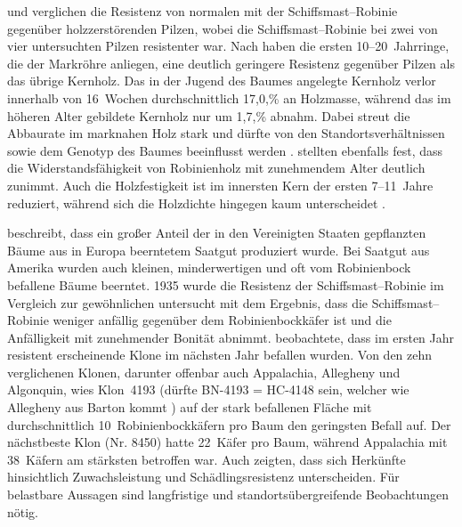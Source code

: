 \documentclass[twocolumn]{scrartcl}
\begin{document}
\citet{hirt1938robinie} und \citet{toole1938robinie} verglichen die
Resistenz von normalen mit der Schiffsmast--Robinie gegenüber
holzzerstörenden Pilzen, wobei die Schiffsmast--Robinie bei zwei von
vier untersuchten Pilzen resistenter war.
Nach \citet{duenisch2009robineHolzJungAlt} haben die ersten
10--20~Jahrringe, die der Markröhre anliegen, eine deutlich geringere
Resistenz gegenüber Pilzen als das übrige Kernholz. Das in der Jugend
des Baumes angelegte Kernholz verlor innerhalb von 16~Wochen
durchschnittlich 17,0,\% an Holzmasse, während das im höheren Alter
gebildete Kernholz nur um 1,7,\% abnahm. Dabei streut die Abbaurate im
marknahen Holz stark und dürfte von den Standortsverhältnissen sowie
dem Genotyp des Baumes beeinflusst werden \citep{brischke2024robineDauerhaftigkeit}.
\citet{szczepkowski2025robinePilze} stellten ebenfalls fest, dass die
Widerstandsfähigkeit von Robinienholz mit zunehmendem Alter deutlich
zunimmt.
Auch die Holzfestigkeit ist im innersten Kern der ersten 7--11~Jahre
reduziert, während sich die Holzdichte hingegen kaum unterscheidet
\citep{adamopoulos2007jungesUndAltesRobinienholz,bijak2021robinienholz}.

\citet{hall1937robinie} beschreibt, dass ein großer Anteil der in den
Vereinigten Staaten gepflanzten Bäume aus in Europa beerntetem Saatgut
produziert wurde. Bei Saatgut aus Amerika wurden auch kleinen,
minderwertigen und oft vom Robinienbock befallene Bäume beerntet. 1935
wurde die Resistenz der Schiffsmast--Robinie im Vergleich zur
gewöhnlichen untersucht mit dem Ergebnis, dass die
Schiffsmast--Robinie weniger anfällig gegenüber dem Robinienbockkäfer
ist und die Anfälligkeit mit zunehmender Bonität abnimmt.
\citet{wollerman1968robinieBorer} beobachtete, dass im ersten Jahr
resistent erscheinende Klone im nächsten Jahr befallen wurden.
Von den zehn verglichenen Klonen, darunter offenbar auch Appalachia,
Allegheny und Algonquin, wies Klon~4193 (dürfte BN-4193 = HC-4148 sein,
welcher wie Allegheny aus Barton kommt
\citep{santamour1960robinie,steinergroup1987robinie}) auf der stark befallenen
Fläche mit durchschnittlich 10~Robinienbockkäfern pro Baum den
geringsten Befall auf. Der nächstbeste Klon (Nr. 8450) hatte 22~Käfer
pro Baum, während Appalachia mit 38~Käfern am stärksten betroffen war.
Auch \citet{genys1990robinie,bridgen1988robinie,mebrahtu1989robinie} zeigten, dass sich Herkünfte hinsichtlich
Zuwachsleistung und Schädlingsresistenz unterscheiden.
Für belastbare Aussagen sind langfristige und standortsübergreifende
Beobachtungen nötig.
\end{document}
